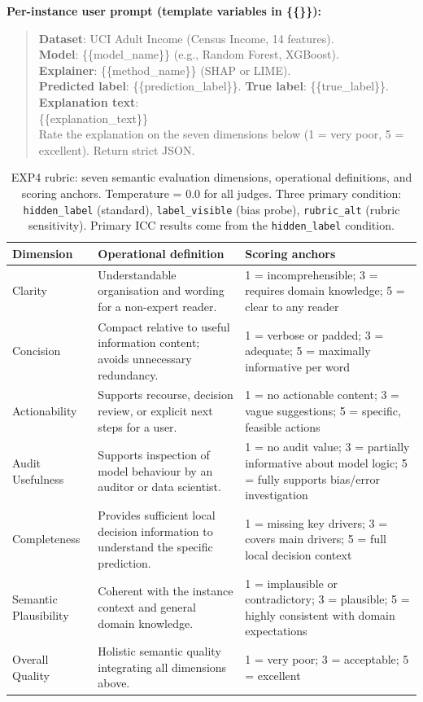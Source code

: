 \documentclass[10pt]{article}
\begin{document}
\medskip
\noindent\textbf{Per-instance user prompt (template variables in \{\{\}\}):}
\begin{quote}\small
\textbf{Dataset}: UCI Adult Income (Census Income, 14 features).\\
\textbf{Model}: \{\{model\_name\}\} (e.g., Random Forest, XGBoost).\\
\textbf{Explainer}: \{\{method\_name\}\} (SHAP or LIME).\\
\textbf{Predicted label}: \{\{prediction\_label\}\}. \textbf{True label}:
\{\{true\_label\}\}.\\[4pt]
\textbf{Explanation text}:\\
\{\{explanation\_text\}\}\\[4pt]
Rate the explanation on the seven dimensions below (1 = very poor,
5 = excellent). Return strict JSON.
\end{quote}

\begin{table}[h]
\centering
\small
\caption{EXP4 rubric: seven semantic evaluation dimensions, operational
definitions, and scoring anchors. Temperature = 0.0 for all judges.
Three primary condition: \texttt{hidden\_label} (standard), \texttt{label\_visible}
(bias probe), \texttt{rubric\_alt} (rubric sensitivity). Primary ICC
results come from the \texttt{hidden\_label} condition.}
\label{tab:s1_rubric}
\begin{tabularx}{\linewidth}{l p{4.2cm} p{5.6cm}}
\toprule
\textbf{Dimension} & \textbf{Operational definition} & \textbf{Scoring anchors} \\
\midrule
Clarity
  & Understandable organisation and wording for a non-expert reader.
  & 1 = incomprehensible; 3 = requires domain knowledge; 5 = clear to any reader \\[4pt]
Concision
  & Compact relative to useful information content; avoids unnecessary redundancy.
  & 1 = verbose or padded; 3 = adequate; 5 = maximally informative per word \\[4pt]
Actionability
  & Supports recourse, decision review, or explicit next steps for a user.
  & 1 = no actionable content; 3 = vague suggestions; 5 = specific, feasible actions \\[4pt]
Audit Usefulness
  & Supports inspection of model behaviour by an auditor or data scientist.
  & 1 = no audit value; 3 = partially informative about model logic; 5 = fully supports bias/error investigation \\[4pt]
Completeness
  & Provides sufficient local decision information to understand the specific prediction.
  & 1 = missing key drivers; 3 = covers main drivers; 5 = full local decision context \\[4pt]
Semantic Plausibility
  & Coherent with the instance context and general domain knowledge.
  & 1 = implausible or contradictory; 3 = plausible; 5 = highly consistent with domain expectations \\[4pt]
Overall Quality
  & Holistic semantic quality integrating all dimensions above.
  & 1 = very poor; 3 = acceptable; 5 = excellent \\
\bottomrule
\end{tabularx}
\end{table}
\end{document}
